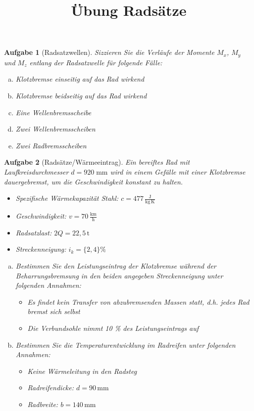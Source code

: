 \documentclass[11pt,a4paper,headsepline]{scrartcl}
\title{\"Ubung Rads\"atze}
\date{}
\newtheorem{aufgabe}{Aufgabe}
\begin{document}
\maketitle
\thispagestyle{fancy}
\pagestyle{fancy}
\vspace{-2cm}
\begin{aufgabe}[Radsatzwellen]
Sizzieren Sie die Verl\"aufe der Momente $M_{x}$, $M_{y}$ und $M_{z}$ entlang der Radsatzwelle f\"ur folgende F\"alle:
	\begin{enumerate}[a)]
	\item Klotzbremse einseitig auf das Rad wirkend
	\item Klotzbremse beidseitig auf das Rad wirkend
	\item Eine Wellenbremsscheibe
	\item Zwei Wellenbremsscheiben
	\item Zwei Radbremsscheiben
	\end{enumerate}
\end{aufgabe}
\vspace{.5cm}
\begin{aufgabe}[Rads\"atze/W\"armeeintrag]
Ein bereiftes Rad mit Laufkreisdurchmesser $d = 920\; \mathrm{mm}$ wird in einem Gef\"alle mit einer Klotzbremse dauergebremst, um die Geschwindigkeit konstant zu halten. 

\begin{itemize}
	\item Spezifische W\"armekapazit\"at Stahl: $c = 477 \, \frac{\mathrm{J}}{\mathrm{kg}\, \mathrm{K}}$
	\item Geschwindigkeit: $v = 70\, \frac{\mathrm{km}}{\mathrm{h}}$
	\item Radsatzlast: $ 2 Q = 22{,5} \, \mathrm{t}$
	\item Streckenneigung: $i_{k} = \{2, 4\} \%$
\end{itemize}
\begin{enumerate}[a)]
\item Bestimmen Sie den Leistungseintrag der Klotzbremse w\"ahrend der Beharrungsbremsung in den beiden angegeben Streckenneigung unter folgenden Annahmen:
	\begin{itemize}
		\item Es findet kein Transfer von abzubremsenden Massen statt, d.h. jedes Rad bremst sich selbst
		\item Die Verbundsohle nimmt 10 \% des Leistungseintrags auf
	\end{itemize}
\item Bestimmen Sie die Temperaturentwicklung im Radreifen unter folgenden Annahmen:
	\begin{itemize}
		\item Keine W\"armeleitung in den Radsteg
		\item Radreifendicke: $d = 90 \, \mathrm{mm}$ 
		\item Radbreite: $b = 140 \, \mathrm{mm}$
	\end{itemize}
\end{enumerate}
\end{aufgabe}
\end{document}
